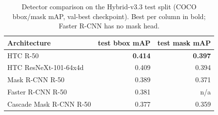 \begin{table}[!tb]
\centering
\caption{Detector comparison on the Hybrid-v3.3 test split (COCO
bbox/mask mAP, val-best checkpoint). Best per column in bold;
Faster R-CNN has no mask head.}
\label{tab:detectors}
\begin{tabular}{lrr}
\toprule
Architecture & test bbox mAP & test mask mAP \\
\midrule
HTC R-50                & \textbf{0.414} & \textbf{0.397} \\
HTC ResNeXt-101-64x4d   & 0.409          & 0.394          \\
Mask R-CNN R-50         & 0.389          & 0.371          \\
Faster R-CNN R-50       & 0.381          & n/a            \\
Cascade Mask R-CNN R-50 & 0.377          & 0.359          \\
\bottomrule
\end{tabular}
\end{table}
